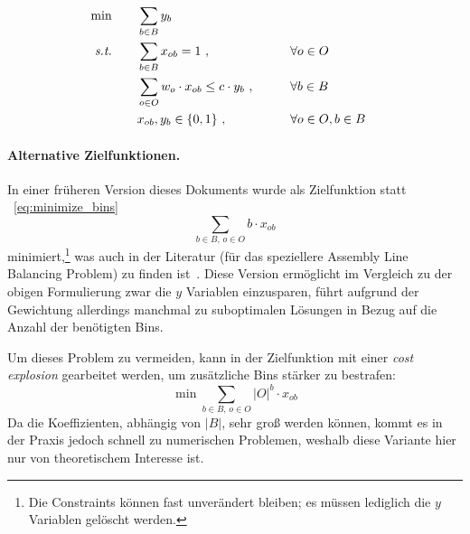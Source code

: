 \begin{align}
    \min \qquad& \sum_{b\in B} y_b \label{eq:minimize_bins}\\
    \textit{s.t.} \qquad
    & \sum_{b\in B} x_{ob} = 1~, \qquad &&\forall o\in O \label{eq:one_bin_per_object} \\
    & \sum_{o\in O} w_{o} \cdot x_{ob} \leq c \cdot y_b~, \qquad &&\forall b\in B \label{eq:max_capacity_bin}\\
    & x_{ob}, y_b \in \{0,1\}~, \qquad &&\forall o\in O, b\in B
\end{align}

\paragraph{Alternative Zielfunktionen.}

In einer früheren Version dieses Dokuments wurde als Zielfunktion statt ~\eqref{eq:minimize_bins}
\[
    \sum_{b\in B,\,o\in O} b \cdot x_{ob}
\]
minimiert,\footnote{Die Constraints können fast unverändert bleiben; es müssen lediglich die $y$ Variablen gelöscht werden.}
was auch in der Literatur (für das speziellere Assembly Line Balancing Problem) zu finden ist~\cite{alb_paper_50}.
Diese Version ermöglicht im Vergleich zu der obigen Formulierung zwar die $y$ Variablen einzusparen,
führt aufgrund der Gewichtung allerdings manchmal zu suboptimalen Lösungen in Bezug auf die Anzahl der benötigten Bins.

Um dieses Problem zu vermeiden, kann in der Zielfunktion mit einer \emph{cost explosion} gearbeitet werden,
um zusätzliche Bins stärker zu bestrafen:
\[
    \min \sum_{b\in B,\,o\in O} |O|^{b} \cdot x_{ob}
\]
Da die Koeffizienten, abhängig von $|B|$, sehr groß werden können, kommt es in der Praxis jedoch schnell zu numerischen Problemen,
weshalb diese Variante hier nur von theoretischem Interesse ist.
